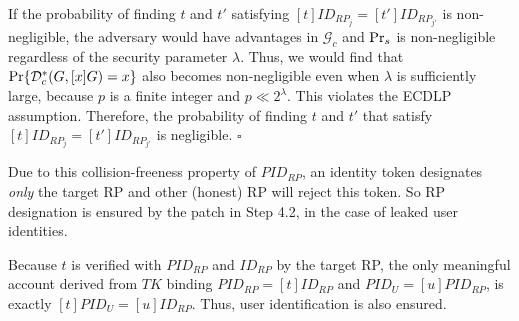 If the probability of finding $t$ and $t'$ satisfying $[t]ID_{RP_j} = [t']ID_{RP_{j'}}$ is non-negligible, the adversary would have advantages  in $\mathcal{G}_c$ and ${\rm Pr}_s$ is non-negligible regardless of the security parameter $\lambda$.
Thus, we would find that ${\rm Pr}\{\mathcal{D}^*_c(G, [x]G)=x\}$ also becomes non-negligible even when $\lambda$ is sufficiently large, because $p$ is a finite integer and $p \ll 2^\lambda$.
This violates the ECDLP assumption. Therefore, the probability of finding $t$ and $t'$ that satisfy $[t]ID_{RP_j} = [t']ID_{RP_{j'}}$ is negligible.
\hfill $\square$

Due to this collision-freeness property of $PID_{RP}$,
    an identity token designates \emph{only} the target RP and other (honest) RP will reject this token.
So RP designation is ensured by the patch in Step 4.2, in the case of leaked user identities.

Because $t$ is verified with $PID_{RP}$ and $ID_{RP}$ by the target RP,
 the only meaningful account derived
from $TK$ binding $PID_{RP}=[t]ID_{RP}$ and $PID_U = [u]PID_{RP}$,
 is exactly $[t]PID_U =[u]ID_{RP}$. Thus, user identification is also ensured.

